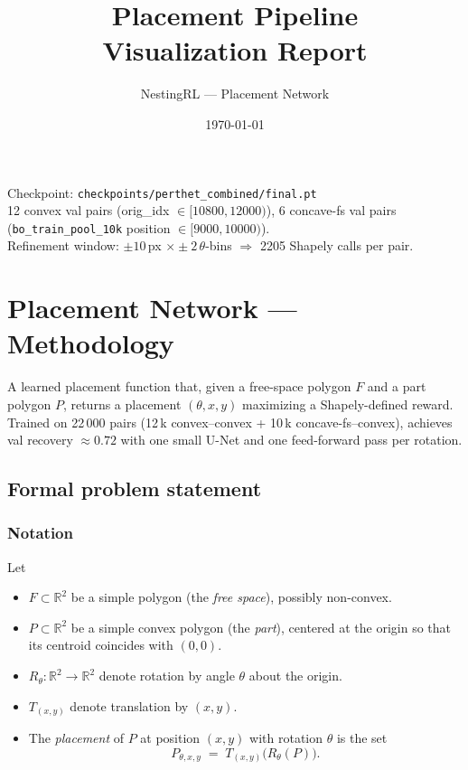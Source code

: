 \documentclass[11pt]{article}
\title{\textsf{\Huge Placement Pipeline}\\[0.3em]\textsf{\Large Visualization Report}}
\author{NestingRL --- Placement Network}
\date{\today}
\newcommand{\code}[1]{\texttt{#1}}
\begin{document}
\maketitle

\begin{center}
\small
Checkpoint: \texttt{checkpoints/perthet\_combined/final.pt}\\[0.3em]
12 convex val pairs (orig\_idx $\in [10800, 12000)$),
6 concave-fs val pairs (\code{bo\_train\_pool\_10k} position $\in [9000, 10000)$).\\
Refinement window: $\pm10$\,px $\times \pm2$\,$\theta$-bins
$\Rightarrow$ 2205 Shapely calls per pair.
\end{center}

\tableofcontents
\newpage

\section{Placement Network --- Methodology}

A learned placement function that, given a free-space polygon $F$ and a part polygon $P$, returns a placement $(\theta, x, y)$ maximizing a Shapely-defined reward.  Trained on 22\,000 pairs (12\,k convex--convex + 10\,k concave-fs--convex), achieves val recovery $\approx 0.72$ with one small U-Net and one feed-forward pass per rotation.

\subsection{Formal problem statement}

\subsubsection{Notation}

Let
\begin{itemize}[leftmargin=*,nosep]
  \item $F \subset \mathbb{R}^2$ be a simple polygon (the \emph{free space}), possibly non-convex.
  \item $P \subset \mathbb{R}^2$ be a simple convex polygon (the \emph{part}), centered at the origin so that its centroid coincides with $(0,0)$.
  \item $R_\theta : \mathbb{R}^2 \to \mathbb{R}^2$ denote rotation by angle $\theta$ about the origin.
  \item $T_{(x,y)}$ denote translation by $(x,y)$.
  \item The \emph{placement} of $P$ at position $(x,y)$ with rotation $\theta$ is the set
  \[
    P_{\theta,x,y} \;=\; T_{(x,y)}\bigl(R_\theta(P)\bigr).
  \]
\end{itemize}
\end{document}
